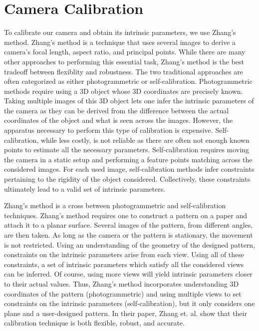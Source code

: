 \section{Camera Calibration}
\label{s:camera}

To calibrate our camera and obtain its intrinsic parameters, we use Zhang's method. 
Zhang's method is a technique that uses several images to derive a camera’s focal length, aspect ratio, and principal points. While there are many other approaches to performing this essential task, Zhang's method is the best tradeoff between flexiblity and robustness. The two traditional approaches are often categorized as either photogrammetric or self-calibration. Photogrammetric methods require using a 3D object whose 3D coordinates are precisely known. Taking multiple images of this 3D object lets one infer the intrinsic parameters of the camera as they can be derived from the difference between the actual coordinates of the object and what is seen across the images. However, the apparatus necessary to perform this type of calibration is expensive. Self-calibration, while less costly, is not reliable as there are often not enough known points to estimate all the necessary parameters. Self-calibration requires moving the camera in a static setup and performing a feature points matching across the considered images. For each used image, self-calibration methods infer constraints pertaining to the rigidity of the object considered. Collectively, these constraints ultimately lead to a valid set of intrinsic parameters. 

Zhang's method is a cross between photogrammetric and self-calibration techniques. Zhang's method requires one to construct a pattern on a paper and attach it to a planar surface. Several images of the pattern, from different angles, are then taken. As long as the camera or the pattern is stationary, the movement is not restricted. Using an understanding of the geometry of the designed pattern, constraints on the intrinsic parameters arise from each view. Using all of these constraints, a set of intrinsic parameters which satisfy all the considered views can be inferred. Of course, using more views will yield intrinsic parameters closer to their actual values. Thus, Zhang’s method incorporates understanding 3D coordinates of the pattern  (photogrammetric) and using multiple views to set constraints on the intrinsic parameters (self-calibration), but it only considers one plane and a user-designed pattern. In their paper, Zhang et. al. show that their calibration technique is both flexible, robust, and accurate. 

